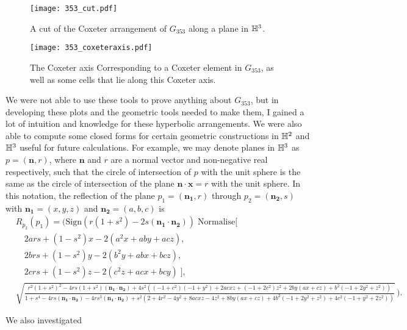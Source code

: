 \begin{figure}
	\centering
	\begin{minipage}{.5\textwidth}
		\centering
		\texttt{[image: 353\_cut.pdf]}
		\caption{A cut of the Coxeter arrangement of $G_{353}$ along a plane in $\mathbb{H}^3$.}
		\label{fig:353_cut}
	\end{minipage}%
	\begin{minipage}{.5\textwidth}
		\centering
		\texttt{[image: 353\_coxeteraxis.pdf]}
		\caption{The Coxeter axis Corresponding to a Coxeter element in $G_{353}$, as well as some cells that lie along this Coxeter axis.}
		\label{fig:353_coxeter_axis}
	\end{minipage}
\end{figure}

We were not able to use these tools to prove anything about $G_{353}$, but in developing these plots and the geometric tools needed to make them, I gained a lot of intuition and knowledge for these hyperbolic arrangements.
We were also able to compute some closed forms for certain geometric constructions in $\mathbb{H}^2$ and  $\mathbb{H}^3$ useful for future calculations.
For example, we may denote planes in $\mathbb{H}^3$ as $p = (\mathbf{n},r)$, where $\mathbf{n}$ and $r$ are a normal vector and non-negative real respectively, such that the circle of intersection of $p$ with the unit sphere is the same as the circle of intersection of the plane $\mathbf{n} \cdot \mathbf{x} = r$ with the unit sphere.
In this notation, the reflection of the plane $p_1 =(\mathbf{n_1},r)$ through $p_2 = (\mathbf{n_2},s)$ with $\mathbf{n_1}=(x,y,z)$ and  $\mathbf{n_2}=(a,b,c)$ is
\begin{align*}
	 & {\scriptscriptstyle R_{p_2}(p_1) =\bigg(\text{Sign}\left(r(1+s^2)-2s(\mathbf{n_1}\cdot\mathbf{n_2})\right)\; \text{Normalise}\big[}                      \\
	 & {\scriptscriptstyle\quad 2ars + (1-s^2)x-2(a^2x+aby+acz),                                                                                             }  \\
	 & {\scriptscriptstyle\quad 2brs + (1-s^2)y-2(b^2y+abx+bcz),                                                                                             }  \\
	 & {\scriptscriptstyle\quad 2crs + (1-s^2)z-2(c^2z+acx+bcy) \;\big],                                                                                      } \\
	 & {\scriptscriptstyle\sqrt{\frac{r^2 (1 + s^2)^2 - 4 r s (1 + s^2) (\mathbf{n_1}\cdot\mathbf{n_2}) +
					4 s^2 ((-1 + c^2) (-1 + y^2) + 2 a c x z + (-1 + 2 c^2) z^2 +
					2 b y (a x + c z) + b^2 (-1 + 2 y^2 + z^2))}{1 + s^4 -
					4 r s (\mathbf{n_1}\cdot\mathbf{n_2}) - 4 r s^3 (\mathbf{n_1}\cdot\mathbf{n_2}) +
					s^2 (2 + 4 r^2 - 4 y^2 + 8 a c x z - 4 z^2 + 8 b y (a x + c z) +
					4 b^2 (-1 + 2 y^2 + z^2) + 4 c^2 (-1 + y^2 + 2 z^2))}}\,\bigg)}.
\end{align*}

We also investigated

